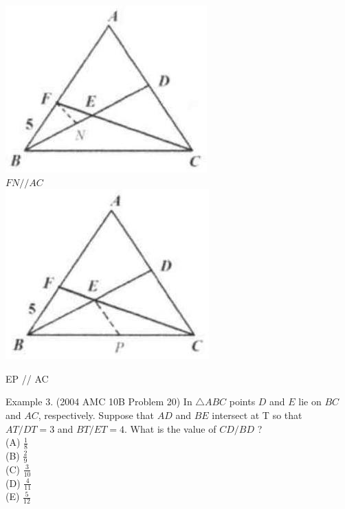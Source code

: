 \documentclass[10pt]{article}
\begin{document}
\includegraphics[max width=\textwidth, center]{2025_04_17_97bc1f7e44d93c271a88g-103(4)}\\
\(F N / / A C\)\\
\includegraphics[max width=\textwidth, center]{2025_04_17_97bc1f7e44d93c271a88g-103(3)}

EP // AC


Example 3. (2004 AMC 10B Problem 20) In \(\triangle A B C\) points \(D\) and \(E\) lie on \(B C\) and \(A C\), respectively. Suppose that \(A D\) and \(B E\) intersect at T so that \(A T / D T=3\) and \(B T / E T=4\). What is the value of \(C D / B D\) ?\\
(A) \(\frac{1}{8}\)\\
(B) \(\frac{2}{9}\)\\
(C) \(\frac{3}{10}\)\\
(D) \(\frac{4}{11}\)\\
(E) \(\frac{5}{12}\)
\end{document}
